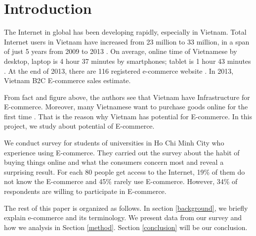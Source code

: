 \documentclass[conference]{IEEEtran}
\begin{document}
\section{Introduction} \label{intro}
The Internet in global has been developing rapidly, especially in Vietnam. Total Internet users in Vietnam have increased from 23 million to 33 million, in a span of just 5 years from 2009 to 2013 \cite{InfoAndData2014}. On average, online time of Vietnamese by desktop, laptop is 4 hour 37 minutes by smartphones; tablet is 1 hour 43 minutes \cite{VietnamMobile2014}. At the end of 2013, there are 116 registered e-commerce website \cite{VietnamMobile2013}. In 2013, Vietnam B2C E-commerce sales estimate. \cite{vecita}



From fact and figure above, the authors see that Vietnam have Infrastructure for E-commerce. Moreover, many Vietnamese want to purchase goods online for the first time \cite{GoogleStudy2013}. That is the reason why Vietnam has potential for E-commerce. In this project, we study about potential of E-commerce.

We conduct survey for students of universities in Ho Chi Minh City who experience using E-commerce. They carried out the survey about the habit of buying things online and what the consumers concern most and reveal a surprising result. For each 80 people get access to the Internet, 19\% of them do not know the E-commerce and 45\% rarely use E-commerce. However, 34\% of respondents are willing to participate in E-commerce.

The rest of this paper is organized as follows. In section \ref{background}, we briefly explain e-commerce and its terminology. We present data from our survey and how we analysis in Section \ref{method}. Section \ref{conclusion} will be our conclusion.




\end{document}
